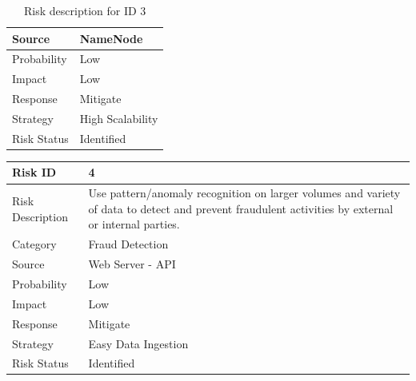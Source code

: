 \documentclass[oneside,a4paper,12pt]{book}
\begin{document}
\begin{center}
\begin{table}[H]
\begin{tabular}{p{1.09in}p{4.07in}}
\hline
\multicolumn{1}{p{1.09in}}{Source} & 
\multicolumn{1}{p{4.07in}}{NameNode} \\
\hline
\multicolumn{1}{p{1.09in}}{Probability} & 
\multicolumn{1}{p{4.07in}}{Low} \\
\hline
\multicolumn{1}{p{1.09in}}{Impact} & 
\multicolumn{1}{p{4.07in}}{Low} \\
\hline
\multicolumn{1}{p{1.09in}}{Response} & 
\multicolumn{1}{p{4.07in}}{Mitigate} \\
\hline
\multicolumn{1}{p{1.09in}}{Strategy} & 
\multicolumn{1}{p{4.07in}}{High Scalability} \\
\hline
\multicolumn{1}{p{1.09in}}{Risk Status} & 
\multicolumn{1}{p{4.07in}}{Identified} \\
\hline
\hline
\end{tabular}
\caption{Risk description for ID 3}
\end{table}
\begin{table}[H]
\centering
\begin{tabular}{p{1.09in}p{4.07in}}
\hline
\hline
\multicolumn{1}{p{1.09in}}{Risk ID} & 
\multicolumn{1}{p{4.07in}}{4} \\
\hline
\multicolumn{1}{p{1.09in}}{Risk Description} & 
\multicolumn{1}{p{4.07in}}{Use pattern/anomaly recognition on larger volumes and variety of data to detect and prevent fraudulent activities by external or internal parties. \par } \\
\hline
\multicolumn{1}{p{1.09in}}{Category} & 
\multicolumn{1}{p{4.07in}}{Fraud Detection} \\
\hline
\multicolumn{1}{p{1.09in}}{Source} & 
\multicolumn{1}{p{4.07in}}{Web Server - API} \\
\hline
\multicolumn{1}{p{1.09in}}{Probability} & 
\multicolumn{1}{p{4.07in}}{Low} \\
\hline
\multicolumn{1}{p{1.09in}}{Impact} & 
\multicolumn{1}{p{4.07in}}{Low} \\
\hline
\multicolumn{1}{p{1.09in}}{Response} & 
\multicolumn{1}{p{4.07in}}{Mitigate} \\
\hline
\multicolumn{1}{p{1.09in}}{Strategy} & 
\multicolumn{1}{p{4.07in}}{Easy Data Ingestion} \\
\hline
\multicolumn{1}{p{1.09in}}{Risk Status} & 
\multicolumn{1}{p{4.07in}}{Identified} \\

\end{tabular}
\end{table}
\end{center}
\end{document}
